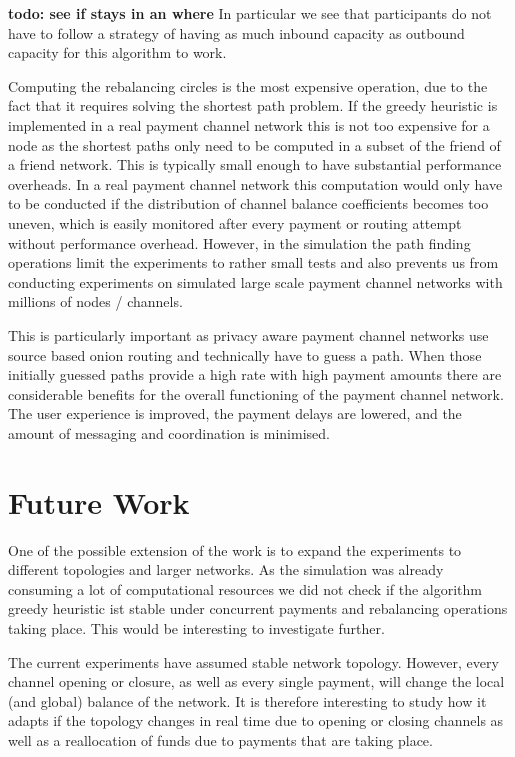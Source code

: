 \documentclass[a4paper]{paper}
\begin{document}
\textbf{todo: see if stays in an where}
In particular we see that participants do not have to follow a strategy of having as much inbound capacity as outbound capacity for this algorithm to work. 

Computing the rebalancing circles is the most expensive operation, due to the fact that it requires solving the shortest path problem.
If the greedy heuristic is implemented in a real payment channel network this is not too expensive for a node as the shortest paths only need to be computed in a subset of the friend of a friend network.
This is typically small enough to have substantial performance overheads. 
In a real payment channel network this computation would only have to be conducted 
if the distribution of channel balance coefficients becomes too uneven,
which is easily monitored after every payment or routing attempt without performance overhead.
However, in the simulation the path finding operations limit the experiments to rather small tests and also prevents us from conducting experiments on simulated large scale payment channel networks with millions of nodes / channels.

This is particularly important as privacy aware payment channel networks use source based onion routing and technically have to guess a path.
When those initially guessed paths provide a high rate with high payment amounts there are considerable benefits for the overall functioning of the payment channel network. 
The user experience is improved, the payment delays are lowered, and the amount of messaging and coordination is minimised.

\section{Future Work}
\label{sec:future}

One of the possible extension of the work is to expand the experiments to different topologies and larger networks.
As the simulation was already consuming a lot of computational resources we did not check if the algorithm greedy heuristic ist stable under concurrent payments and rebalancing operations taking place. 
This would be interesting to investigate further.

The current experiments have assumed stable network topology. 
However, every channel opening or closure, as well as every single payment, will change the local (and global) balance of the network.
It is therefore interesting to study how it adapts if the topology changes in real time due to opening or closing channels as well as a reallocation of funds due to payments that are taking place. 
\end{document}

